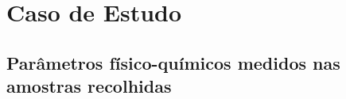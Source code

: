 \chapter{Caso de Estudo}

\section{Parâmetros físico-químicos medidos nas amostras recolhidas} \label{ap:parametros}
